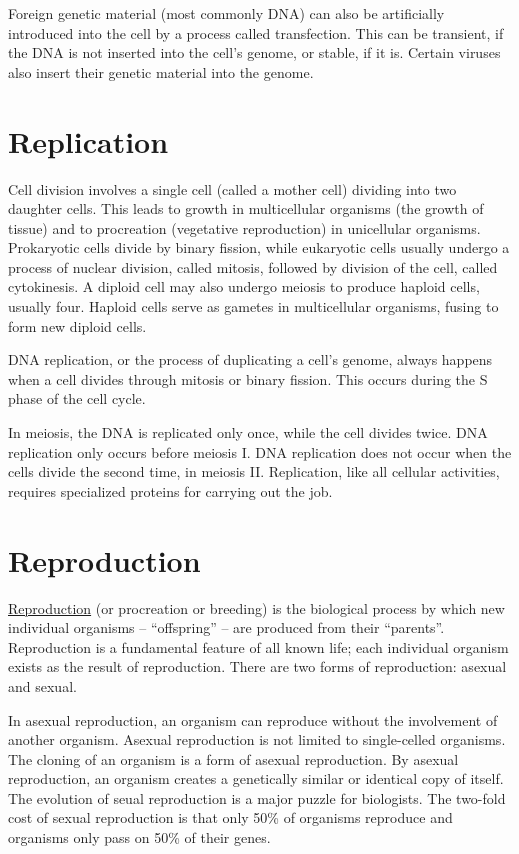 Foreign genetic material (most commonly DNA) can also be artificially introduced into the cell by a process called transfection. This can be transient, if the DNA is not inserted into the cell's genome, or stable, if it is. Certain viruses also insert their genetic material into the genome.

\hypertarget{replication}{%
\section{Replication}\label{replication}}

Cell division involves a single cell (called a mother cell) dividing into two daughter cells. This leads to growth in multicellular organisms (the growth of tissue) and to procreation (vegetative reproduction) in unicellular organisms. Prokaryotic cells divide by binary fission, while eukaryotic cells usually undergo a process of nuclear division, called mitosis, followed by division of the cell, called cytokinesis. A diploid cell may also undergo meiosis to produce haploid cells, usually four. Haploid cells serve as gametes in multicellular organisms, fusing to form new diploid cells.

DNA replication, or the process of duplicating a cell's genome, always happens when a cell divides through mitosis or binary fission. This occurs during the S phase of the cell cycle.

In meiosis, the DNA is replicated only once, while the cell divides twice. DNA replication only occurs before meiosis I. DNA replication does not occur when the cells divide the second time, in meiosis II. Replication, like all cellular activities, requires specialized proteins for carrying out the job.

\hypertarget{reproduction-1}{%
\section{Reproduction}\label{reproduction-1}}

\href{https://en.wikipedia.org/wiki/Reproduction}{Reproduction} (or procreation or breeding) is the biological process by which new individual organisms -- ``offspring'' -- are produced from their ``parents''. Reproduction is a fundamental feature of all known life; each individual organism exists as the result of reproduction. There are two forms of reproduction: asexual and sexual.

In asexual reproduction, an organism can reproduce without the involvement of another organism. Asexual reproduction is not limited to single-celled organisms. The cloning of an organism is a form of asexual reproduction. By asexual reproduction, an organism creates a genetically similar or identical copy of itself. The evolution of seual reproduction is a major puzzle for biologists. The two-fold cost of sexual reproduction is that only 50\% of organisms reproduce and organisms only pass on 50\% of their genes.

